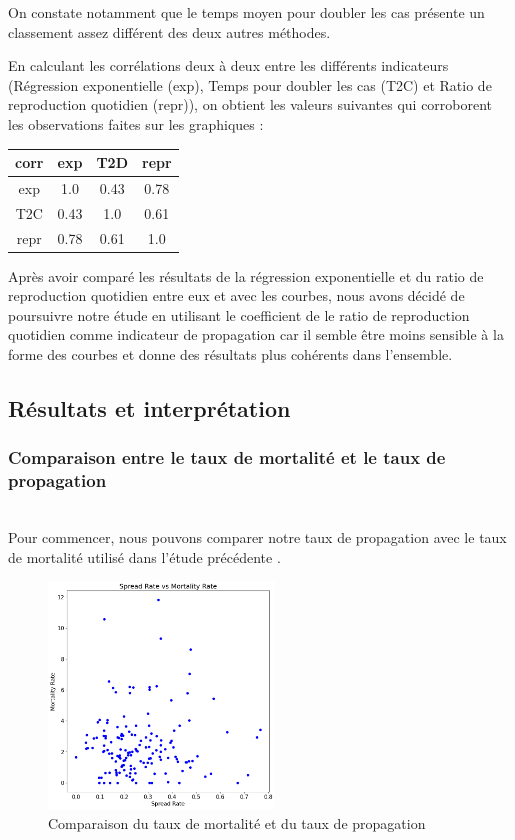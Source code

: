 \documentclass[12pt]{iEEEtran}
\begin{document}
On constate notamment que le temps moyen pour doubler les cas présente un classement assez
différent des deux autres méthodes.

En calculant les corrélations deux à deux entre les différents indicateurs (Régression exponentielle (exp),
Temps pour doubler les cas (T2C) et Ratio de reproduction quotidien (repr)), on obtient les
valeurs suivantes qui corroborent les observations faites sur les graphiques :

\begin{table}[h]
    \centering
    \begin{tabular}{|c|c|c|c|}
        \hline
        corr & exp & T2D & repr \\
        \hline
        exp & 1.0 & 0.43 & 0.78 \\
        T2C & 0.43 & 1.0 & 0.61 \\
        repr & 0.78 & 0.61 & 1.0 \\
        \hline
    \end{tabular}
\end{table}

Après avoir comparé les résultats de la régression exponentielle et du ratio de reproduction
quotidien entre eux et avec les courbes, nous avons décidé de poursuivre notre étude en
utilisant le coefficient de le ratio de reproduction quotidien comme indicateur de propagation
car il semble être moins sensible à la forme des courbes et donne des résultats plus cohérents
dans l'ensemble.

\newpage
\subsection{Résultats et interprétation}

\subsubsection{Comparaison entre le taux de mortalité et le taux de propagation}\hfill\\

Pour commencer, nous pouvons comparer notre taux de propagation avec le taux de mortalité
utilisé dans l'étude précédente \cite{kaggle}.

\begin{figure}[h]
    \centering
    \includegraphics[width=6cm]{img/spread_mort_corr.png}
    \caption{Comparaison du taux de mortalité et du taux de propagation}

    \label{fig:spread_mort_corr}
\end{figure}
\end{document}
